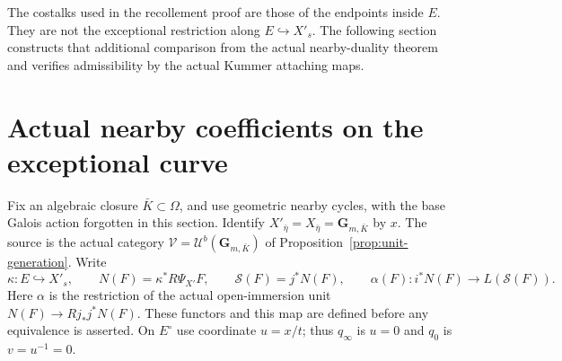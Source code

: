 \documentclass[11pt]{article}
\theoremstyle{definition}
\theoremstyle{remark}
\begin{document}
The costalks used in the recollement proof are those of the endpoints
inside $E$.  They are not the exceptional restriction along
$E\hookrightarrow X'_s$.  The following section constructs that
additional comparison from the actual nearby-duality theorem and
verifies admissibility by the actual Kummer attaching maps.

\section{Actual nearby coefficients on the exceptional curve}
Fix an algebraic closure $\bar K\subset\Omega$, and use geometric
nearby cycles, with the base Galois action forgotten in this section.
Identify $X'_{\bar\eta}=X_{\bar\eta}=\mathbf G_{m,\bar K}$ by $x$.
The source is the actual category
$\mathcal V=\mathcal U^b(\mathbf G_{m,\bar K})$ of
Proposition~\ref{prop:unit-generation}.  Write
\[
 \kappa:E\hookrightarrow X'_s,\qquad
 N(F)=\kappa^*R\Psi_{X'}F,\qquad
 \mathcal S(F)=j^*N(F),\qquad
 \alpha(F):i^*N(F)\longrightarrow L(\mathcal S(F)).
\]
Here $\alpha$ is the restriction of the actual open-immersion unit
$N(F)\to Rj_*j^*N(F)$.  These functors and this map are defined before
any equivalence is asserted.  On $E^\circ$ use coordinate $u=x/t$;
thus $q_\infty$ is $u=0$ and $q_0$ is $v=u^{-1}=0$.
\end{document}
